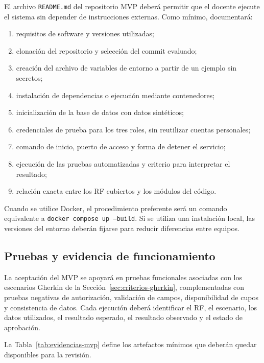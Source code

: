 \documentclass[12pt,a4paper]{article}
\begin{document}
El archivo \texttt{README.md} del repositorio MVP deberá permitir que el docente ejecute el sistema sin depender de instrucciones externas. Como mínimo, documentará:

\begin{enumerate}
  \item requisitos de software y versiones utilizadas;
  \item clonación del repositorio y selección del commit evaluado;
  \item creación del archivo de variables de entorno a partir de un ejemplo sin secretos;
  \item instalación de dependencias o ejecución mediante contenedores;
  \item inicialización de la base de datos con datos sintéticos;
  \item credenciales de prueba para los tres roles, sin reutilizar cuentas personales;
  \item comando de inicio, puerto de acceso y forma de detener el servicio;
  \item ejecución de las pruebas automatizadas y criterio para interpretar el resultado;
  \item relación exacta entre los RF cubiertos y los módulos del código.
\end{enumerate}

Cuando se utilice Docker, el procedimiento preferente será un comando equivalente a \texttt{docker compose up --build}. Si se utiliza una instalación local, las versiones del entorno deberán fijarse para reducir diferencias entre equipos.

\subsection{Pruebas y evidencia de funcionamiento}

La aceptación del MVP se apoyará en pruebas funcionales asociadas con los escenarios Gherkin de la Sección~\ref{sec:criterios-gherkin}, complementadas con pruebas negativas de autorización, validación de campos, disponibilidad de cupos y consistencia de datos. Cada ejecución deberá identificar el RF, el escenario, los datos utilizados, el resultado esperado, el resultado observado y el estado de aprobación.

La Tabla~\ref{tab:evidencias-mvp} define los artefactos mínimos que deberán quedar disponibles para la revisión.
\end{document}
